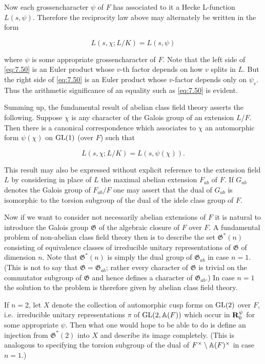 Now each grossencharacter $\psi$ of $F$ has associated to it a Hecke L-function $L(s,\psi)$. Therefore the reciprocity law above may alternately be written in the form

\begin{equation}\label{eq:7.50}
L(s,\chi; L/K) = L(s,\psi)\tag{7.50}
\end{equation}

where $\psi$ is some appropriate grossencharacter of $F$. Note that the left side of \eqref{eq:7.50} is an Euler product whose $v$-th factor depends on how $v$ splits in $L$. But the right side of \eqref{eq:7.50} is an Euler product whose $v$-factor depends only on $\psi_v$. Thus the arithmetic significance of an equality such as \eqref{eq:7.50} is evident.

Summing up, the fundamental result of abelian class field theory asserts the following. Suppose $\chi$ is any character of the Galois group of an extension $L/F$. Then there is a canonical correspondence which associates to $\chi$ an automorphic form $\psi(\chi)$ on $\operatorname{GL}(1)$ (over $F$) such that

\begin{equation}\label{eq:7.51}
L(s,\chi; L/K) = L(s,\psi(\chi)).\tag{7.51}
\end{equation}

This result may also be expressed without explicit reference to the extension field $L$ by considering in place of $L$ the maximal abelian extension $F_{ab}$ of $F$. If $G_{ab}$ denotes the Galois group of $F_{ab}/F$ one may assert that the dual of $G_{ab}$ is isomorphic to the torsion subgroup of the dual of the idele class group of $F$.

Now if we want to consider not necessarily abelian extensions of $F$ it is natural to introduce the Galois group $\mathfrak{G}$ of the algebraic closure of $F$ over $F$. A fundamental problem of non-abelian class field theory then is to describe the set $\mathfrak{G}^*(n)$ consisting of equivalence classes of irreducible unitary representations of $\mathfrak{G}$ of dimension $n$. Note that $\mathfrak{G}^*(n)$ is simply the dual group of $\mathfrak{G}_{ab}$ in case $n = 1$. (This is not to say that $\mathfrak{G} = \mathfrak{G}_{ab}$; rather every character of $\mathfrak{G}$ is trivial on the commutator subgroup of $\mathfrak{G}$ and hence defines a character of $\mathfrak{G}_{ab}$.) In case $n = 1$ the solution to the problem is therefore given by abelian class field theory.

If $n = 2$, let $X$ denote the collection of automorphic cusp forms on $\operatorname{GL}(2)$ over $F$, i.e.\ irreducible unitary representations $\pi$ of $\operatorname{GL}(2,\mathbb{A}(F))$ which occur in $\mathbf{R}_0^\psi$ for some appropriate $\psi$. Then what one would hope to be able to do is define an injection from $\mathfrak{G}^*(2)$ into $X$ and describe its image completely. (This is analogous to specifying the torsion subgroup of the dual of $F^{\times}\setminus\mathbb{A}(F)^{\times}$ in case $n = 1$.)

